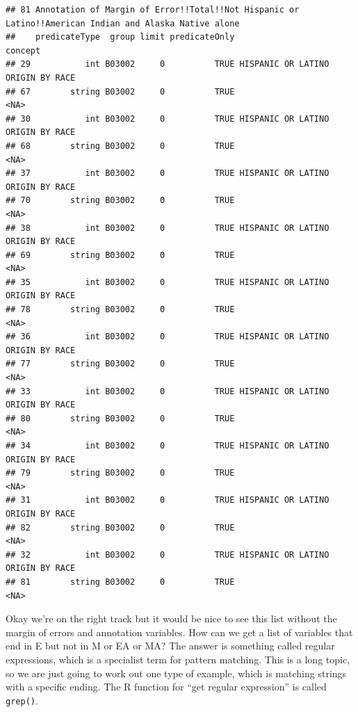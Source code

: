 \documentclass[openany]{book}
\newenvironment{Shaded}{\begin{snugshade}}{\end{snugshade}}
\newcommand{\CommentTok}[1]{\textcolor[rgb]{0.56,0.35,0.01}{\textit{#1}}}
\newcommand{\KeywordTok}[1]{\textcolor[rgb]{0.13,0.29,0.53}{\textbf{#1}}}
\newcommand{\NormalTok}[1]{#1}
\newcommand{\StringTok}[1]{\textcolor[rgb]{0.31,0.60,0.02}{#1}}
\begin{document}
\begin{verbatim}
## 81 Annotation of Margin of Error!!Total!!Not Hispanic or Latino!!American Indian and Alaska Native alone
##    predicateType  group limit predicateOnly                           concept
## 29           int B03002     0          TRUE HISPANIC OR LATINO ORIGIN BY RACE
## 67        string B03002     0          TRUE                              <NA>
## 30           int B03002     0          TRUE HISPANIC OR LATINO ORIGIN BY RACE
## 68        string B03002     0          TRUE                              <NA>
## 37           int B03002     0          TRUE HISPANIC OR LATINO ORIGIN BY RACE
## 70        string B03002     0          TRUE                              <NA>
## 38           int B03002     0          TRUE HISPANIC OR LATINO ORIGIN BY RACE
## 69        string B03002     0          TRUE                              <NA>
## 35           int B03002     0          TRUE HISPANIC OR LATINO ORIGIN BY RACE
## 78        string B03002     0          TRUE                              <NA>
## 36           int B03002     0          TRUE HISPANIC OR LATINO ORIGIN BY RACE
## 77        string B03002     0          TRUE                              <NA>
## 33           int B03002     0          TRUE HISPANIC OR LATINO ORIGIN BY RACE
## 80        string B03002     0          TRUE                              <NA>
## 34           int B03002     0          TRUE HISPANIC OR LATINO ORIGIN BY RACE
## 79        string B03002     0          TRUE                              <NA>
## 31           int B03002     0          TRUE HISPANIC OR LATINO ORIGIN BY RACE
## 82        string B03002     0          TRUE                              <NA>
## 32           int B03002     0          TRUE HISPANIC OR LATINO ORIGIN BY RACE
## 81        string B03002     0          TRUE                              <NA>
\end{verbatim}

Okay we're on the right track but it would be nice to see this list without the margin of errors and annotation variables. How can we get a list of variables that end in E but not in M or EA or MA? The answer is something called regular expressions, which is a specialist term for pattern matching. This is a long topic, so we are just going to work out one type of example, which is matching strings with a specific ending. The R function for ``get regular expression'' is called \texttt{grep()}.

\begin{Shaded}
\end{Shaded}
\end{document}
